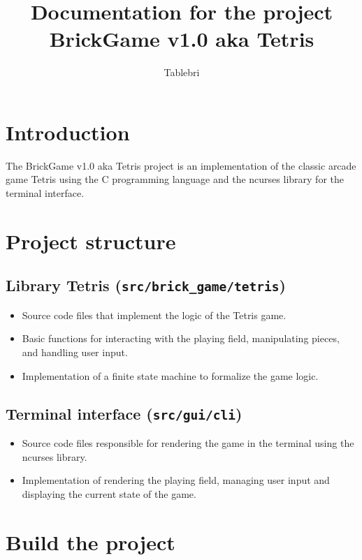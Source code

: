 \documentclass{article}
\author{Tablebri}
\begin{document}
\title{Documentation for the project BrickGame v1.0 aka Tetris}
\date{}
\maketitle

\section{Introduction}

The BrickGame v1.0 aka Tetris project is an implementation of the classic arcade game Tetris using the C programming language and the ncurses library for the terminal interface.

\section{Project structure}

\subsection{Library Tetris (\texttt{src/brick\_game/tetris})}

\begin{itemize}[label=--]
    \item Source code files that implement the logic of the Tetris game.
    \item Basic functions for interacting with the playing field, manipulating pieces, and handling user input.
    \item Implementation of a finite state machine to formalize the game logic.
\end{itemize}

\subsection{Terminal interface (\texttt{src/gui/cli})}

\begin{itemize}[label=--]
    \item Source code files responsible for rendering the game in the terminal using the ncurses library.
    \item Implementation of rendering the playing field, managing user input and displaying the current state of the game.
\end{itemize}

\section{Build the project}
\end{document}
